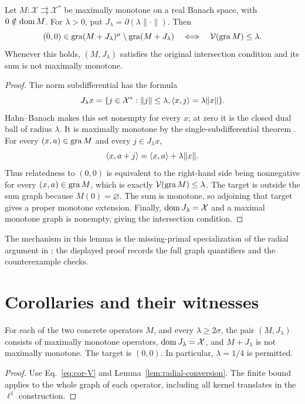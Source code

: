 \begin{lemma}\label{lem:radial-conversion}
Let $M:\mathcal X\rightrightarrows\mathcal X^*$ be maximally monotone
on a real Banach space, with $0\notin\operatorname{dom} M$. For $\lambda>0$, put
$J_\lambda=\partial(\lambda\|\cdot\|)$. Then
\begin{equation}
(0,0)\in\operatorname{gra}(M+J_\lambda)^\mu\setminus\operatorname{gra}(M+J_\lambda)
\quad\Longleftrightarrow\quad
\mathcal V(\operatorname{gra} M)\le\lambda.
\label{eq:cor-exact-radial}
\end{equation}
Whenever this holds, $(M,J_\lambda)$ satisfies the original intersection
condition and its sum is not maximally monotone.
\end{lemma}
\begin{proof}
The norm subdifferential has the formula
\[
J_\lambda x=\{j\in\mathcal X^*: \|j\|\le\lambda,
                         \langle x,j\rangle=\lambda\|x\|\}.
\]
Hahn--Banach makes this set nonempty for every $x$; at zero it is the
closed dual ball of radius $\lambda$. It is maximally monotone by the
single-subdifferential theorem \cite[Theorem~A]{rockafellar1970subdiff}.
For every $(x,a)\in\operatorname{gra} M$ and every $j\in J_\lambda x$,
\[
\langle x,a+j\rangle=\langle x,a\rangle+\lambda\|x\|.
\]
Thus relatedness to $(0,0)$ is equivalent to the right-hand side being
nonnegative for every $(x,a)\in\operatorname{gra} M$, which is exactly
$\mathcal V(\operatorname{gra} M)\le\lambda$. The target is outside the sum graph
because $M(0)=\varnothing$. The sum is monotone, so adjoining that target
gives a proper monotone extension. Finally, $\operatorname{dom} J_\lambda=\mathcal X$
and a maximal monotone graph is nonempty, giving the intersection condition.
\end{proof}
The mechanism in this lemma is the missing-primal specialization of the
radial argument in \cite[Theorem~1.2, proof]{verona2008}; the displayed
proof records the full graph quantifiers and the counterexample checks.

\section{Corollaries and their witnesses}
\begin{corollary}\label{cor:radial}
For each of the two concrete operators $M$, and every $\lambda\ge2\sigma$,
the pair $(M,J_\lambda)$ consists of maximally monotone operators,
$\operatorname{dom} J_\lambda=\mathcal X$, and $M+J_\lambda$ is not maximally monotone.
The target is $(0,0)$. In particular, $\lambda=1/4$ is permitted.
\end{corollary}
\begin{proof}
Use Eq.~\eqref{eq:cor-V} and Lemma~\ref{lem:radial-conversion}.
The finite bound applies to the whole graph of each operator, including
all kernel translates in the $\ell^1$ construction.
\end{proof}

